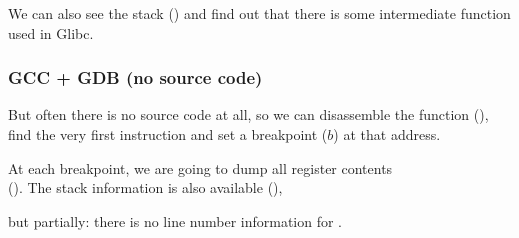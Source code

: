 We can also see the stack () and find out that there is some intermediate function  used in Glibc.



\subsubsection{GCC + GDB (no source code)}

But often there is no source code at all, so we can disassemble the \comp function (), find the very first
\CMP instruction and set a breakpoint ($b$) at that address.

At each breakpoint, we are going to dump all register contents\\
().
The stack information is also available (), 

but partially: there is no line number information for \comp.




